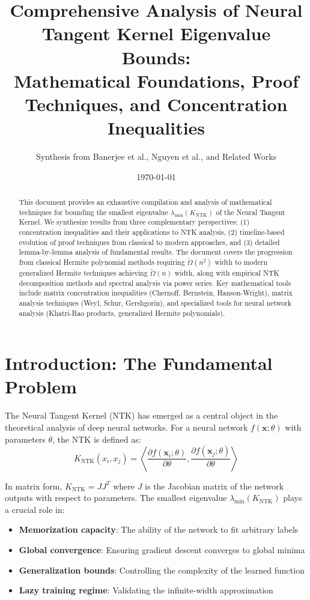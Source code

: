 \documentclass{article}
\title{Comprehensive Analysis of Neural Tangent Kernel Eigenvalue Bounds:\\
Mathematical Foundations, Proof Techniques, and Concentration Inequalities}
\author{Synthesis from Banerjee et al., Nguyen et al., and Related Works}
\date{\today}
\newcommand{\x}{\mathbf{x}}
\newcommand{\KNTK}{K_{\text{NTK}}}
\newcommand{\lambdaMin}{\lambda_{\min}}
\newcommand{\TildeOmega}{\tilde{\Omega}}
\begin{document}
\maketitle

\begin{abstract}
This document provides an exhaustive compilation and analysis of mathematical techniques for bounding the smallest eigenvalue $\lambdaMin(\KNTK)$ of the Neural Tangent Kernel. We synthesize results from three complementary perspectives: (1) concentration inequalities and their applications to NTK analysis, (2) timeline-based evolution of proof techniques from classical to modern approaches, and (3) detailed lemma-by-lemma analysis of fundamental results. The document covers the progression from classical Hermite polynomial methods requiring $\TildeOmega(n^2)$ width to modern generalized Hermite techniques achieving $\TildeOmega(n)$ width, along with empirical NTK decomposition methods and spectral analysis via power series. Key mathematical tools include matrix concentration inequalities (Chernoff, Bernstein, Hanson-Wright), matrix analysis techniques (Weyl, Schur, Gershgorin), and specialized tools for neural network analysis (Khatri-Rao products, generalized Hermite polynomials).
\end{abstract}

\tableofcontents
\newpage

\section{Introduction: The Fundamental Problem}

The Neural Tangent Kernel (NTK) has emerged as a central object in the theoretical analysis of deep neural networks. For a neural network $f(\x; \theta)$ with parameters $\theta$, the NTK is defined as:
$$\KNTK(x_i, x_j) = \left\langle \frac{\partial f(\x_i; \theta)}{\partial \theta}, \frac{\partial f(\x_j; \theta)}{\partial \theta} \right\rangle$$

In matrix form, $\KNTK = JJ^T$ where $J$ is the Jacobian matrix of the network outputs with respect to parameters. The smallest eigenvalue $\lambdaMin(\KNTK)$ plays a crucial role in:

\begin{itemize}
    \item \textbf{Memorization capacity}: The ability of the network to fit arbitrary labels
    \item \textbf{Global convergence}: Ensuring gradient descent converges to global minima
    \item \textbf{Generalization bounds}: Controlling the complexity of the learned function
    \item \textbf{Lazy training regime}: Validating the infinite-width approximation
\end{itemize}
\end{document}
